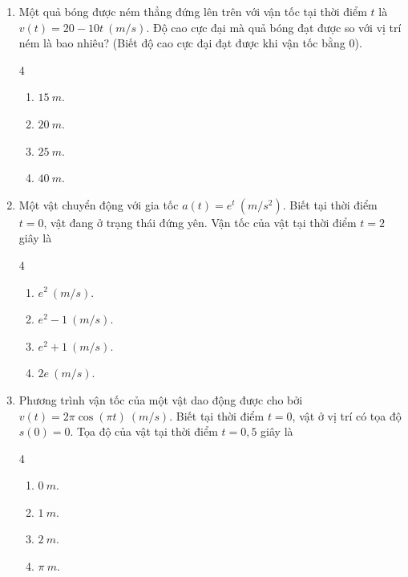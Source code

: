 \documentclass[12pt]{article}
\begin{document}
\begin{enumerate}[label=\textbf{Câu \arabic*.}]
		\item Một quả bóng được ném thẳng đứng lên trên với vận tốc tại thời điểm $t$ là $v(t) = 20 - 10t \ (m/s)$. Độ cao cực đại mà quả bóng đạt được so với vị trí ném là bao nhiêu? (Biết độ cao cực đại đạt được khi vận tốc bằng $0$).
		\begin{multicols}{4}
			\begin{enumerate}[label=\textbf{\Alph*.}]
				\item $15 \ m$.
				\item $20 \ m$.
				\item $25 \ m$.
				\item $40 \ m$.
			\end{enumerate}
		\end{multicols}
		
		\item Một vật chuyển động với gia tốc $a(t) = e^t \ (m/s^2)$. Biết tại thời điểm $t = 0$, vật đang ở trạng thái đứng yên. Vận tốc của vật tại thời điểm $t = 2$ giây là
		\begin{multicols}{4}
			\begin{enumerate}[label=\textbf{\Alph*.}]
				\item $e^2 \ (m/s)$.
				\item $e^2 - 1 \ (m/s)$.
				\item $e^2 + 1 \ (m/s)$.
				\item $2e \ (m/s)$.
			\end{enumerate}
		\end{multicols}
		
		\item Phương trình vận tốc của một vật dao động được cho bởi $v(t) = 2\pi \cos(\pi t) \ (m/s)$. Biết tại thời điểm $t = 0$, vật ở vị trí có tọa độ $s(0) = 0$. Tọa độ của vật tại thời điểm $t = 0,5$ giây là
		\begin{multicols}{4}
			\begin{enumerate}[label=\textbf{\Alph*.}]
				\item $0 \ m$.
				\item $1 \ m$.
				\item $2 \ m$.
				\item $\pi \ m$.
			\end{enumerate}
		\end{multicols}
		

\end{enumerate}
\end{document}

